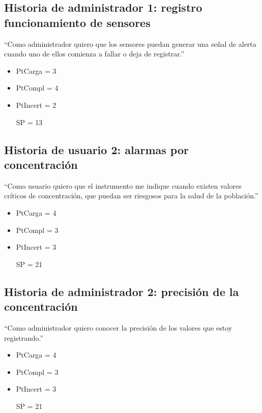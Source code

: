 \subsection{Historia de administrador 1: registro funcionamiento de sensores}
``Como administrador quiero que los sensores puedan generar una señal de alerta cuando uno de ellos comienza a fallar o deja de registrar.''
\begin{itemize}
	\item PtCarga = 3
	\item PtCompl = 4
	\item PtIncert = 2
	\item [SP = 13]
\end{itemize}

\subsection{Historia de usuario 2: alarmas por concentración}
``Como usuario quiero que el instrumento me indique cuando existen valores críticos de concentración, que puedan ser riesgosos para la salud de la población.''
\begin{itemize}
	\item PtCarga = 4
	\item PtCompl = 3
	\item PtIncert = 3
	\item [SP = 21]
\end{itemize}

\subsection{Historia de administrador 2: precisión de la concentración}
``Como administrador quiero conocer la precisión de los valores que estoy registrando.''
\begin{itemize}
	\item PtCarga = 4
	\item PtCompl = 3
	\item PtIncert = 3
	\item [SP = 21]
\end{itemize}





